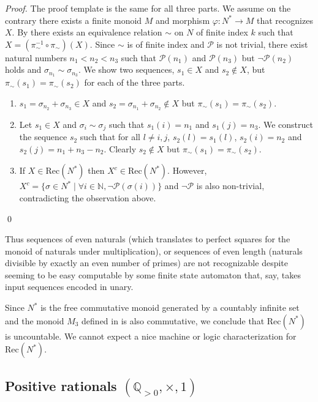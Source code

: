 \documentclass{llncs}
\begin{document}
\begin{proof}
  The proof template is the same for all three parts. We assume on the contrary there exists a finite monoid $M$ and morphism $\varphi: N^* \to M$ that recognizes $X$. By  there exists an equivalence relation $\sim$ on $N$ of finite index $k$ such that $X = (\pi_\sim^{-1} \circ \pi_\sim) (X)$. Since $\sim$ is of finite index and $\mathcal{P}$ is not trivial, there exist natural numbers $n_1 < n_2 < n_3$ such that $\mathcal{P}(n_1)$ and $\mathcal{P}(n_3)$ but $\neg\mathcal{P}(n_2)$ holds and $\sigma_{n_1} \sim \sigma_{n_3}$. We show two sequences, $s_1 \in X$ and $s_2 \notin X$, but $\pi_\sim(s_1) = \pi_\sim(s_2)$ for each of the three parts.
  \begin{enumerate}
    \item  $s_1 = \sigma_{n_2} + \sigma_{n_3} \in X$ and $s_2 = \sigma_{n_1} + \sigma_{n_2} \notin X$ but $\pi_\sim(s_1) = \pi_\sim(s_2)$.

    \item Let $s_1 \in X$ and $\sigma_i \sim \sigma_j$ such that $s_1(i) = n_1$ and $s_1(j) = n_3$. We construct the sequence $s_2$ such that for all $l \neq i, j$, $s_2(l) = s_1(l)$, $s_2(i) = n_2$ and $s_2(j) = n_1 + n_3 - n_2$. Clearly $s_2 \notin X$ but $\pi_\sim(s_1) = \pi_\sim(s_2)$.

    \item If $X \in \text{Rec}(N^*)$ then $X^c \in \text{Rec}(N^*)$. However, $X^c = \{\sigma \in N^* \mid \forall i \in \mathbb{N}, \neg\mathcal{P}(\sigma(i))\}$ and $\neg\mathcal{P}$ is also non-trivial, contradicting the observation above.
  \end{enumerate}
  \qed
\end{proof}

Thus sequences of even naturals (which translates to perfect squares for the monoid of naturals under multiplication), or sequences of even length (naturals divisible by exactly an even number of primes) are not recognizable despite seeming to be easy computable by some finite state automaton that, say, takes input sequences encoded in unary.

Since $N^*$ is the free commutative monoid generated by a countably infinite set and the monoid $M_3$ defined in  is also commutative, we conclude that $\text{Rec}(N^*)$ is uncountable. We cannot expect a nice machine or logic characterization for $\text{Rec}(N^*)$.

\subsection{Positive rationals $(\mathbb{Q}_{>0}, \times, 1)$}
\end{document}
